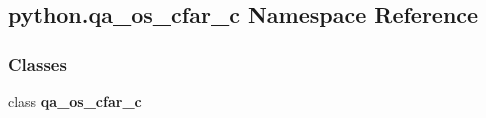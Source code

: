 \subsection{python.\+qa\+\_\+os\+\_\+cfar\+\_\+c Namespace Reference}
\label{namespacepython_1_1qa__os__cfar__c}
\subsubsection*{Classes}
\begin{DoxyCompactItemize}
\item 
class {\bf qa\+\_\+os\+\_\+cfar\+\_\+c}
\end{DoxyCompactItemize}
